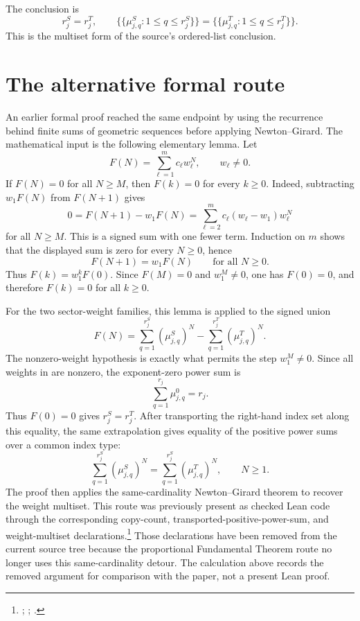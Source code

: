 \documentclass{article}
\begin{document}
The conclusion is
\[
    r_j^S=r_j^T,
    \qquad
    \{\!\{\mu^S_{j,q}:1\le q\le r_j^S\}\!\}
    =
    \{\!\{\mu^T_{j,q}:1\le q\le r_j^T\}\!\}.
\]
This is the multiset form of the source's ordered-list conclusion.

\section{The alternative formal route}

An earlier formal proof reached the same endpoint by using the recurrence
behind finite sums of geometric sequences before applying Newton--Girard. The
mathematical input is the following elementary lemma. Let
\[
    F(N)=\sum_{\ell=1}^{m} c_\ell w_\ell^N,
    \qquad w_\ell\neq 0.
\]
If $F(N)=0$ for all $N\ge M$, then $F(k)=0$ for every $k\ge 0$. Indeed,
subtracting $w_1F(N)$ from $F(N+1)$ gives
\[
    0
    =
    F(N+1)-w_1F(N)
    =
    \sum_{\ell=2}^{m} c_\ell(w_\ell-w_1)w_\ell^N
\]
for all $N\ge M$. This is a signed sum with one fewer term. Induction on
$m$ shows that the displayed sum is zero for every $N\ge 0$, hence
\[
    F(N+1)=w_1F(N)\qquad\text{for all }N\ge 0.
\]
Thus $F(k)=w_1^kF(0)$. Since $F(M)=0$ and $w_1^M\neq 0$, one has
$F(0)=0$, and therefore $F(k)=0$ for all $k\ge 0$.

For the two sector-weight families, this lemma is applied to the signed union
\[
    F(N)
    =
    \sum_{q=1}^{r_j^S}(\mu^S_{j,q})^N
    -
    \sum_{q=1}^{r_j^T}(\mu^T_{j,q})^N.
\]
The nonzero-weight hypothesis is exactly what permits the step $w_1^M\neq 0$.
Since all weights in  are nonzero, the exponent-zero
power sum is
\[
    \sum_{q=1}^{r_j}\mu_{j,q}^{0}=r_j.
\]
Thus $F(0)=0$ gives $r_j^S=r_j^T$. After transporting the right-hand index
set along this equality, the same extrapolation gives equality of the positive
power sums over a common index type:
\[
    \sum_{q=1}^{r_j^S}(\mu^S_{j,q})^N
    =
    \sum_{q=1}^{r_j^S}(\mu^T_{j,q})^N,
    \qquad N\ge 1.
\]
The proof then applies the same-cardinality Newton--Girard theorem to recover
the weight multiset. This route was previously present as checked Lean code
through the corresponding copy-count, transported-positive-power-sum, and
weight-multiset declarations.\footnote{;
;
.}
Those declarations have been removed from the current source tree because the
proportional Fundamental Theorem route no longer uses this same-cardinality
detour. The calculation above records the removed argument for comparison
with the paper, not a present Lean proof.
\end{document}
